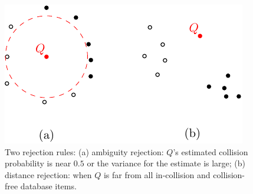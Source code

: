 \begin{figure}[!h]
  \centering
  \includegraphics[width=0.45\linewidth]{figs/3/reject.pdf}
  \caption[Two rejection rules used in instance-based learning]{Two rejection rules: (a) ambiguity rejection: $Q$'s estimated collision probability is near $0.5$ or the variance for the estimate is large; (b) distance rejection: when $Q$ is far from all in-collision and collision-free database items.}
  \label{fig:3:reject}
\end{figure}


